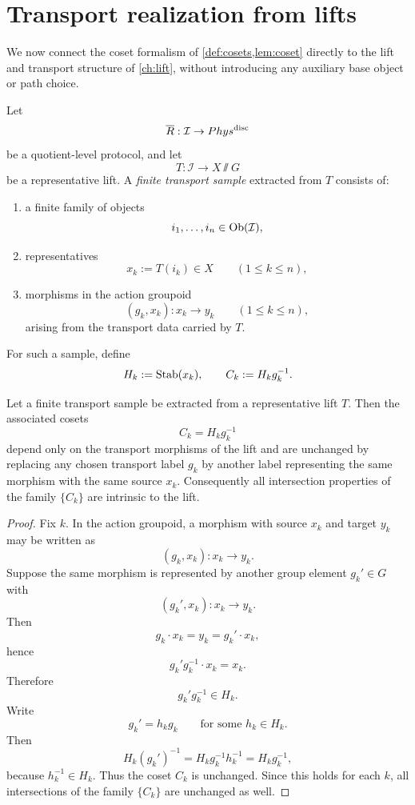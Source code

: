 \section{Transport realization from lifts}
We now connect the coset formalism of
\cref{def:cosets,lem:coset} directly to the lift and
transport structure of \cref{ch:lift}, without introducing any
auxiliary base object or path choice.
\begin{definition}
	\label{def:transport-sample}
	Let
	\[
		\overline R:\mathcal I\to Phys^{\mathrm{disc}}
	\]
	be a quotient-level protocol, and let
	\[
		T:\mathcal I\to X\sslash G
	\]
	be a representative lift.
	A \emph{finite transport sample} extracted from \(T\) consists of:
	\begin{enumerate}
		\item a finite family of objects
		      \[
			      i_1,\dots,i_n\in\operatorname{Ob}(\mathcal I),
		      \]
		\item representatives
		      \[
			      x_k:=T(i_k)\in X
			      \qquad
			      (1\le k\le n),
		      \]
		\item morphisms in the action groupoid
		      \[
			      (g_k,x_k):x_k\to y_k
			      \qquad
			      (1\le k\le n),
		      \]
		      arising from the transport data carried by \(T\).
	\end{enumerate}
	For such a sample, define
	\[
		H_k:=\operatorname{Stab}(x_k),
		\qquad
		C_k:=H_k g_k^{-1}.
	\]
\end{definition}
\begin{lemma}
	\label{lem:intrinsic-cosets}
	Let a finite transport sample be extracted from a representative lift
	\(T\). Then the associated cosets
	\[
		C_k=H_k g_k^{-1}
	\]
	depend only on the transport morphisms of the lift and are unchanged by
	replacing any chosen transport label \(g_k\) by another label
	representing the same morphism with the same source \(x_k\).
	Consequently all intersection properties of the family \(\{C_k\}\) are
	intrinsic to the lift.
\end{lemma}
\begin{proof}
	Fix \(k\). In the action groupoid, a morphism with source \(x_k\) and
	target \(y_k\) may be written as
	\[
		(g_k,x_k):x_k\to y_k.
	\]
	Suppose the same morphism is represented by another group element
	\(g_k'\in G\) with
	\[
		(g_k',x_k):x_k\to y_k.
	\]
	Then
	\[
		g_k\cdot x_k=y_k=g_k'\cdot x_k,
	\]
	hence
	\[
		g_k' g_k^{-1}\cdot x_k=x_k.
	\]
	Therefore
	\[
		g_k' g_k^{-1}\in H_k.
	\]
	Write
	\[
		g_k'=h_k g_k
		\qquad
		\text{for some } h_k\in H_k.
	\]
	Then
	\[
		H_k (g_k')^{-1}
		=
		H_k g_k^{-1} h_k^{-1}
		=
		H_k g_k^{-1},
	\]
	because \(h_k^{-1}\in H_k\).
	Thus the coset \(C_k\) is unchanged.
	Since this holds for each \(k\), all intersections of the family
	\(\{C_k\}\) are unchanged as well.
\end{proof}

